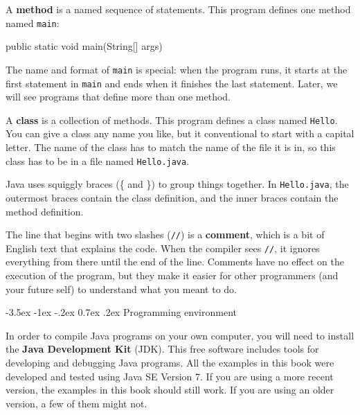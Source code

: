 \documentclass[12pt]{book}
\makeatletter
\theoremstyle{exercise}
\newcommand{\java}[1]{\verb"#1"}
\renewcommand{\section}{\@startsection{section}{1}{\z@}%
    {-3.5ex \@plus -1ex \@minus -.2ex}%
    {0.7ex \@plus.2ex}%
    {\normalfont\Large\bfseries}}
\newcommand{\java}[1]{\lstinline{#1}} %
\makeatother
\begin{document}


A {\bf method} is a named sequence of statements.
This program defines one method named \java{main}:

\begin{code}
    public static void main(String[] args)
\end{code}


The name and format of \java{main} is special: when the program runs, it starts at the first statement in \java{main} and ends when it finishes the last statement.
Later, we will see programs that define more than one method.


A {\bf class} is a collection of methods.
This program defines a class named \java{Hello}.
You can give a class any name you like, but it conventional to start with a capital letter.
The name of the class has to match the name of the file it is in, so this class has to be in a file named \java{Hello.java}.


Java uses squiggly braces (\{ and \}) to group things together.
In {\tt Hello.java}, the outermost braces contain the class definition, and the inner braces contain the method definition.


The line that begins with two slashes (\java{//}) is a {\bf comment}, which is a bit of English text that explains the code.
When the compiler sees \java{//}, it ignores everything from there until the end of the line.
Comments have no effect on the execution of the program, but they make it easier for other programmers (and your future self) to understand what you meant to do.


\section{Programming environment}


In order to compile Java programs on your own computer, you will need to install the {\bf Java Development Kit} (JDK).
This free software includes tools for developing and debugging Java programs.
All the examples in this book were developed and tested using Java SE Version 7.
If you are using a more recent version, the examples in this book should still work.
If you are using an older version, a few of them might not.
\end{document}

